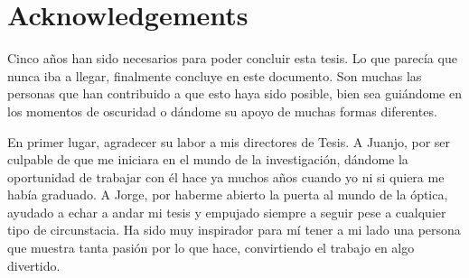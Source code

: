 \chapter*{Acknowledgements}
Cinco años han sido necesarios para poder concluir esta tesis. Lo que parecía que nunca iba a llegar, finalmente concluye en este documento. Son muchas las personas que han contribuido a que esto haya sido posible, bien sea guiándome en los momentos de oscuridad o dándome su apoyo de muchas formas diferentes. 

En primer lugar, agradecer su labor a mis directores de Tesis. A Juanjo, por ser culpable de que me iniciara en el mundo de la investigación, dándome la oportunidad de trabajar con él hace ya muchos años cuando yo ni si quiera me había graduado. A Jorge, por haberme abierto la puerta al mundo de la óptica, ayudado a echar a andar mi tesis y empujado siempre a seguir pese a cualquier tipo de circunstacia. Ha sido muy inspirador para mí tener a mi lado una persona que muestra tanta pasión por lo que hace, convirtiendo el trabajo en algo divertido.


